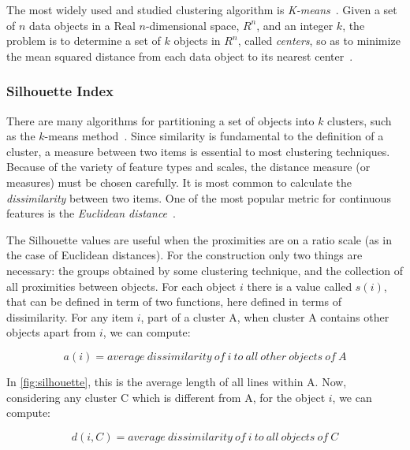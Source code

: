 \documentclass[journal]{IEEEtran}
\begin{document}

	The most widely used and studied clustering algorithm is \textit{K-means}~\cite{}. Given a set of $n$ data objects in a Real $n$-dimensional space, $R^n$, and an integer $k$, the problem is to determine a set of $k$ objects in $R^n$, called \textit{centers}, so as to minimize the mean squared distance from each data object to its nearest center~\cite{kanungo2002efficient}.
	
	
	\subsubsection{Silhouette Index}
	\label{sec:sillhouetteIndex}
	
	There are many algorithms for partitioning a set of objects into $k$ clusters, such as the $k$-means method~\cite{kanungo2002efficient}. Since similarity is fundamental to the definition of a cluster, a measure between two items is essential to most clustering techniques. Because of the variety of feature types and scales, the distance measure (or measures) must be chosen carefully. It is most common to calculate the \textit{dissimilarity} between two items. One of the most popular metric for continuous features is the \textit{Euclidean distance}~\cite{jain1988algorithms}.
	
	The Silhouette values are useful when the proximities are on a ratio scale (as in the case of Euclidean distances). For the construction only two things are necessary: the groups obtained by some clustering technique, and the collection of all proximities between objects. For each object $i$ there is a value called $s(i)$, that can be defined in term of two functions, here defined in terms of dissimilarity. For any item $i$, part of a cluster A, when cluster A contains other objects apart from $i$, we can compute:
	
	\begin{equation} \label{eq:a_i}
	a(i) = average~dissimilarity~of~i~to~all~other~objects~of~A
	\end{equation}
	
	In \ref{fig:silhouette}, this is the average length of all lines within A. Now, considering any cluster C which is different from A, for the object $i$, we can compute:
	
	\begin{equation} \label{eq:d_i}
	d(i, C) = average~dissimilarity~of~i~to~all~objects~of~C
	\end{equation}
	
\end{document}
